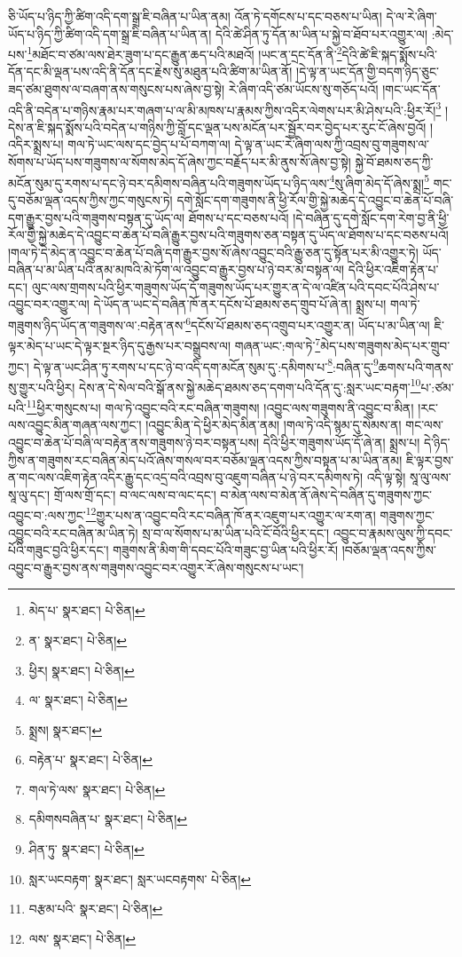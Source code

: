ཅི་ཡོད་པ་ཉིད་ཀྱི་ཚིག་འདི་དག་སྒྲ་ཇི་བཞིན་པ་ཡིན་ནམ། འོན་ཏེ་དགོངས་པ་དང་བཅས་པ་ཡིན། དེ་ལ་རེ་ཞིག་ཡོད་པ་ཉིད་ཀྱི་ཚིག་འདི་དག་སྒྲ་ཇི་བཞིན་པ་ཡིན་ན། དེའི་ཚེ་ཤིན་ཏུ་དོན་མ་ཡིན་པ་སྐྱེ་བ་ཐོབ་པར་འགྱུར་ལ། :མེད་པས་\footnote{མེད་པ་  སྣར་ཐང་།  པེ་ཅིན། }མཐོང་བ་ཙམ་ལས་ཐེར་ཟུག་པ་དང་རྒྱུན་ཆད་པའི་མཐའོ། །ཡང་ན་དྲང་དོན་ནི་\footnote{ན་  སྣར་ཐང་།  པེ་ཅིན། }དེའི་ཚེ་ཇི་སྐད་སྨོས་པའི་དོན་དང་མི་ལྡན་པས་འདི་ནི་དོན་དང་རྗེས་སུ་མཐུན་པའི་ཚིག་མ་ཡིན་ནོ། །དེ་ལྟ་ན་ཡང་དོན་གྱི་བདག་ཉིད་ཅུང་ཟད་ཙམ་ཐུགས་ལ་བཞག་ནས་གསུངས་པས་ཞེས་བྱ་སྟེ། རེ་ཞིག་འདི་ཙམ་ཡོངས་སུ་གཅོད་པའོ། །གང་ཡང་དོན་འདི་ནི་བདེན་པ་གཉིས་རྣམ་པར་གཞག་པ་ལ་མི་མཁས་པ་རྣམས་ཀྱིས་འདིར་ལེགས་པར་མི་ཤེས་པའི་:ཕྱིར་རོ།\footnote{ཕྱིར།  སྣར་ཐང་།  པེ་ཅིན། } །དེས་ན་ཇི་སྐད་སྨོས་པའི་བདེན་པ་གཉིས་ཀྱི་བློ་དང་ལྡན་པས་མངོན་པར་སྦྱོར་བར་བྱེད་པར་རུང་ངོ་ཞེས་བྱའོ། །འདིར་སྨྲས་པ། གལ་ཏེ་ཡང་ལས་དང་བྱེད་པ་པོ་བཀག་ལ། དེ་ལྟ་ན་ཡང་རེ་ཞིག་ལས་ཀྱི་འབྲས་བུ་གཟུགས་ལ་སོགས་པ་ཡོད་པས་གཟུགས་ལ་སོགས་མེད་དོ་ཞེས་ཀྱང་བརྗོད་པར་མི་ནུས་སོ་ཞེས་བྱ་སྟེ། སྐྱེ་བོ་ཐམས་ཅད་ཀྱི་མངོན་སུམ་དུ་རགས་པ་དང་ཉེ་བར་དམིགས་བཞིན་པའི་གཟུགས་ཡོད་པ་ཉིད་ལས་\footnote{ལ་  སྣར་ཐང་།  པེ་ཅིན། }སུ་ཞིག་མེད་དོ་ཞེས་སྨྲ།\footnote{སྨྲས།  སྣར་ཐང་། } གང་དུ་བཅོམ་ལྡན་འདས་ཀྱིས་ཀྱང་གསུངས་ཏེ། དགེ་སློང་དག་གཟུགས་ནི་ཕྱི་རོལ་གྱི་སྐྱེ་མཆེད་དེ་འབྱུང་བ་ཆེན་པོ་བཞི་དག་རྒྱུར་བྱས་པའི་གཟུགས་བསྟན་དུ་ཡོད་ལ། ཐོགས་པ་དང་བཅས་པའོ། །དེ་བཞིན་དུ་དགེ་སློང་དག་རེག་བྱ་ནི་ཕྱི་རོལ་གྱི་སྐྱེ་མཆེད་དེ་འབྱུང་བ་ཆེན་པོ་བཞི་རྒྱུར་བྱས་པའི་གཟུགས་ཅན་བསྟན་དུ་ཡོད་ལ་ཐོགས་པ་དང་བཅས་པའོ། །གལ་ཏེ་དེ་མེད་ན་འབྱུང་བ་ཆེན་པོ་བཞི་དག་རྒྱུར་བྱས་སོ་ཞེས་འབྱུང་བའི་རྒྱུ་ཅན་དུ་སྟོན་པར་མི་འགྱུར་ཏེ། ཡོད་བཞིན་པ་མ་ཡིན་པའི་ནམ་མཁའི་མེ་ཏོག་ལ་འབྱུང་བ་རྒྱུར་བྱས་པ་ཉེ་བར་མ་བསྟན་ལ། དེའི་ཕྱིར་འཇིག་རྟེན་པ་དང་། ལུང་ལས་གྲགས་པའི་ཕྱིར་གཟུགས་ཡོད་དོ་གཟུགས་ཡོད་པར་གྱུར་ན་དེ་ལ་འཛིན་པའི་དབང་པོའི་ཤེས་པ་འབྱུང་བར་འགྱུར་ལ། དེ་ཡོད་ན་ཡང་དེ་བཞིན་ཁོ་ནར་དངོས་པོ་ཐམས་ཅད་གྲུབ་པོ་ཞེ་ན། སྨྲས་པ། གལ་ཏེ་གཟུགས་ཉིད་ཡོད་ན་གཟུགས་ལ་:བརྟེན་ནས་\footnote{བརྟེན་པ་  སྣར་ཐང་།  པེ་ཅིན། }དངོས་པོ་ཐམས་ཅད་འགྲུབ་པར་འགྱུར་ན། ཡོད་པ་མ་ཡིན་ལ། ཇི་ལྟར་མེད་པ་ཡང་དེ་ལྟར་སྔར་ཉིད་དུ་རྒྱས་པར་བསྒྲུབས་ལ། གཞན་ཡང་:གལ་ཏེ་\footnote{གལ་ཏེ་ལས་  སྣར་ཐང་།  པེ་ཅིན། }མེད་པས་གཟུགས་མེད་པར་གྲུབ་ཀྱང་། དེ་ལྟ་ན་ཡང་ཤིན་ཏུ་རགས་པ་དང་ཉེ་བ་འདི་དག་མངོན་སུམ་དུ་:དམིགས་པ་\footnote{དམིགསབཞིན་པ་  སྣར་ཐང་།  པེ་ཅིན། }:བཞིན་དུ་\footnote{ཤིན་ཏུ་  སྣར་ཐང་།  པེ་ཅིན། }ཆགས་པའི་གནས་སུ་གྱུར་པའི་ཕྱིར། དེས་ན་དེ་སེལ་བའི་སྒོ་ནས་སྐྱེ་མཆེད་ཐམས་ཅད་དགག་པའི་དོན་དུ་:སླར་ཡང་བརྟག་\footnote{སླར་ཡངབརྟག་  སྣར་ཐང་། སླར་ཡངབརྟགས་  པེ་ཅིན། }པ་:ཙམ་པའི་\footnote{བརྩམ་པའི་  སྣར་ཐང་།  པེ་ཅིན། }ཕྱིར་གསུངས་པ། གལ་ཏེ་འབྱུང་བའི་རང་བཞིན་གཟུགས། །འབྱུང་ལས་གཟུགས་ནི་འབྱུང་བ་མིན། །རང་ལས་འབྱུང་མིན་གཞན་ལས་ཀྱང་། །འབྱུང་མིན་དེ་ཕྱིར་མེད་མིན་ནམ། །གལ་ཏེ་འདི་སྙམ་དུ་སེམས་ན། གང་ལས་འབྱུང་བ་ཆེན་པོ་བཞི་ལ་བརྟེན་ནས་གཟུགས་ཉེ་བར་བསྟན་པས། དེའི་ཕྱིར་གཟུགས་ཡོད་དོ་ཞེ་ན། སྨྲས་པ། དེ་ཉིད་ཀྱིས་ན་གཟུགས་རང་བཞིན་མེད་པའོ་ཞེས་གསལ་བར་བཅོམ་ལྡན་འདས་ཀྱིས་བསྟན་པ་མ་ཡིན་ནམ། ཇི་ལྟར་བྱས་ན་གང་ལས་འཇིག་རྟེན་འདིར་རྒྱུ་དང་འདྲ་བའི་འབྲས་བུ་འཇུག་བཞིན་པ་ཉེ་བར་དམིགས་ཏེ། འདི་ལྟ་སྟེ། སཱ་ལུ་ལས་སཱ་ལུ་དང་། གྲོ་ལས་གྲོ་དང་། བ་ལང་ལས་བ་ལང་དང་། བ་མེན་ལས་བ་མེན་ནོ་ཞེས་དེ་བཞིན་དུ་གཟུགས་ཀྱང་འབྱུང་བ་:ལས་ཀྱང་\footnote{ལས་  སྣར་ཐང་།  པེ་ཅིན། }གྱུར་པས་ན་འབྱུང་བའི་རང་བཞིན་ཁོ་ནར་འཇུག་པར་འགྱུར་ལ་རག་ན། གཟུགས་ཀྱང་འབྱུང་བའི་རང་བཞིན་མ་ཡིན་ཏེ། སྲ་བ་ལ་སོགས་པ་མ་ཡིན་པའི་ངོ་བོའི་ཕྱིར་དང་། འབྱུང་བ་རྣམས་ལུས་ཀྱི་དབང་པོའི་གཟུང་བྱའི་ཕྱིར་དང་། གཟུགས་ནི་མིག་གི་དབང་པོའི་གཟུང་བྱ་ཡིན་པའི་ཕྱིར་རོ། །བཅོམ་ལྡན་འདས་ཀྱིས་འབྱུང་བ་རྒྱུར་བྱས་ནས་གཟུགས་འབྱུང་བར་འགྱུར་རོ་ཞེས་གསུངས་པ་ཡང་། 